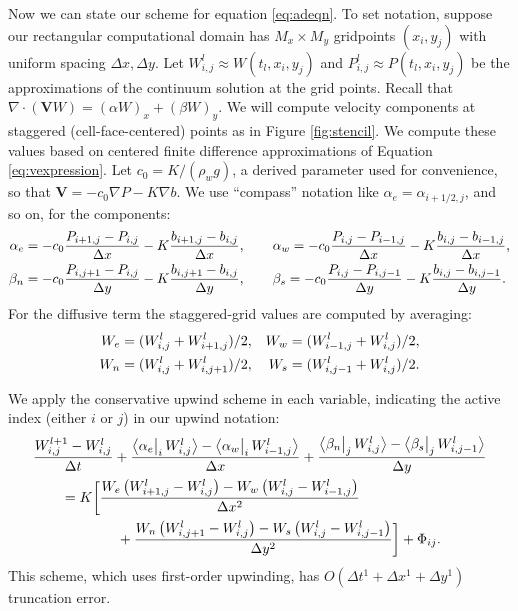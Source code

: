 \documentclass[11pt,final]{amsart}%
\newcommand\bV{\mathbf{V}}
\newcommand{\Div}{\nabla\cdot}
\newcommand{\grad}{\nabla}
\newcommand{\Wlij}{W^l_{i,j}}
\newcommand{\Plij}{P^l_{i,j}}
\newcommand{\upp}[3]{\big<#1\big|_{#3}\,#2\big>}
\begin{document}
Now we can state our scheme for equation \eqref{eq:adeqn}.  To set notation, suppose our rectangular computational domain has $M_x \times M_y$ gridpoints $(x_i,y_j)$ with uniform spacing $\Delta x,\Delta y$.  Let $\Wlij \approx W(t_l,x_i,y_j)$ and $\Plij \approx P(t_l,x_i,y_j)$ be the approximations of the continuum solution at the grid points.  Recall that $\Div \left(\bV W\right) = (\alpha W)_x + (\beta W)_y$.  We will compute velocity components at staggered (cell-face-centered) points as in Figure \ref{fig:stencil}.  We compute these values based on centered finite difference approximations of Equation \eqref{eq:vexpression}.  Let $c_0=K/(\rho_w g)$, a derived parameter used for convenience, so that $\bV = - c_0 \grad P - K \grad b$.  We use ``compass'' notation like $\alpha_e = \alpha_{i+1/2,j}$, and so on, for the components:
\begin{align}
\alpha_e &= - c_0 \frac{P_{i+1,j}-P_{i,j}}{\Delta x} - K \frac{b_{i+1,j}-b_{i,j}}{\Delta x}, \qquad \alpha_w = - c_0 \frac{P_{i,j}-P_{i-1,j}}{\Delta x} - K \frac{b_{i,j}-b_{i-1,j}}{\Delta x}, \label{eq:velocitycomp} \\
\beta_n  &= - c_0 \frac{P_{i,j+1}-P_{i,j}}{\Delta y} - K \frac{b_{i,j+1}-b_{i,j}}{\Delta y}, \qquad \beta_s = - c_0 \frac{P_{i,j}-P_{i,j-1}}{\Delta y} - K \frac{b_{i,j}-b_{i,j-1}}{\Delta y}. \notag
\end{align}
For the diffusive term the staggered-grid values are computed by averaging:
\begin{align}
W_e &= (W_{i,j}^l + W_{i+1,j}^l)/2, & W_w &= (W_{i-1,j}^l + W_{i,j}^l)/2, \label{eq:stagW} \\
W_n &= (W_{i,j}^l + W_{i,j+1}^l)/2, & W_s &= (W_{i,j-1}^l + W_{i,j}^l)/2. \notag
\end{align}

We apply the conservative upwind scheme in each variable, indicating the active index (either $i$ or $j$) in our upwind notation:
\begin{align}
 &\frac{W_{i,j}^{l+1} - \Wlij}{\Delta t} + \frac{\upp{\alpha_e}{\Wlij}{i} - \upp{\alpha_w}{W_{i-1,j}^l}{i}}{\Delta x} + \frac{\upp{\beta_n}{\Wlij}{j} - \upp{\beta_s}{W_{i,j-1}^l}{j}}{\Delta y}  \label{eq:Wfd} \\
      &\qquad = K \bigg[\frac{W_e \left(W_{i+1,j}^l - \Wlij\right) - W_w \left(\Wlij - W_{i-1,j}^l\right)}{\Delta x^2}  \notag \\
      &\qquad\qquad\qquad + \frac{W_n \left(W_{i,j+1}^l - \Wlij\right) - W_s \left(\Wlij - W_{i,j-1}^l\right)}{\Delta y^2}\bigg] + \Phi_{ij}. \notag
\end{align}
This scheme, which uses first-order upwinding, has $O(\Delta t^1 + \Delta x^1 + \Delta y^1)$ truncation error.
\end{document}
